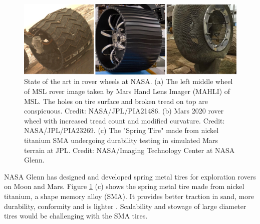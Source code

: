\documentclass{article}
\begin{document}
\begin{figure}[hbt!]
    \centering
    \includegraphics[]{general-images/mars_rover_wheels.png}
    \caption{State of the art in rover wheels at NASA. (a) The left middle wheel of MSL rover image taken by Mars Hand Lens Imager (MAHLI) of MSL. The holes on tire surface and broken tread on top are conspicuous. Credit: NASA/JPL/PIA21486. (b) Mars 2020 rover wheel with increased tread count and modified curvature. Credit: NASA/JPL/PIA23269. (c) The "Spring Tire" made from nickel titanium SMA undergoing durability testing in simulated Mars terrain at JPL. Credit: NASA/Imaging Technology Center at NASA Glenn.}
    \label{soa_wheels}
\end{figure}

NASA Glenn has designed and developed spring metal tires for exploration rovers on Moon and Mars. Figure \ref{soa_wheels} (c) shows the spring metal tire made from nickel titanium, a shape memory alloy (SMA). It provides better traction in sand, more durability, conformity and is lighter \cite{padula2018shape}. Scalability and stowage of large diameter tires would be challenging with the SMA tires. 
\end{document}
